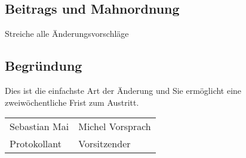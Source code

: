 \documentclass[a4paper,12pt,titlepage]{scrartcl}
\begin{document}
\subsection*{Beitrags und Mahnordnung}
Streiche alle Änderungsvorschläge

\subsection*{Begründung}
Dies ist die einfachste Art der Änderung und Sie ermöglicht eine zweiwöchentliche Frist zum Austritt.

\newpage

\nopagebreak
\vspace{10\baselineskip}
\begin{tabularx}{\textwidth}[b]{X X}
	\hline
	Sebastian Mai & Michel Vorsprach \\
	Protokollant & Vorsitzender
\end{tabularx}

\appendix

\end{document}
